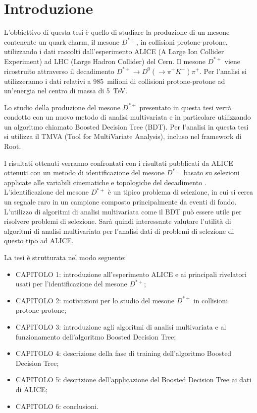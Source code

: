 \chapter*{Introduzione}
L'obbiettivo di questa tesi è quello di studiare la produzione di un mesone contenente un quark charm, il mesone $D^{*+}$,  in collisioni protone-protone, utilizzando i dati raccolti dall'esperimento ALICE (A Large Ion Collider Experiment) ad LHC (Large Hadron Collider) del Cern. Il mesone $D^{*+}$ viene ricostruito attraverso il decadimento $D^{*+} \rightarrow D^0(\rightarrow \pi^+ K^-) \pi^+$. Per l'analisi si utilizzeranno i dati relativi a 985~milioni di collisioni protone-protone ad un'energia nel centro di massa di 5~TeV.

Lo studio della produzione del mesone $D^{*+}$ presentato in questa tesi verrà condotto con un nuovo metodo di analisi multivariata e in particolare utilizzando un algoritmo chiamato Boosted Decision Tree (BDT). Per l'analisi in questa tesi si utilizza il TMVA \cite{TMVA} (Tool for MultiVariate Analysis), incluso nel framework di Root\cite{Root}. 

I risultati ottenuti verranno confrontati con i risultati pubblicati da ALICE ottenuti con un metodo di identificazione del mesone $D^{*+}$  basato su selezioni applicate alle variabili cinematiche e topologiche del decadimento \cite{dati_ALICE}. 
L'identificazione del mesone $D^{*+}$ è un tipico problema di selezione, in cui si cerca un segnale raro in un campione composto principalmente da eventi di fondo. L'utilizzo di algoritmi di analisi multivariata come il BDT può essere utile per risolvere problemi di selezione. Sar\`a quindi interessante valutare l'utilità di algoritmi di analisi multivariata per l'analisi dati di problemi di selezione di questo tipo ad ALICE.

La tesi \`e strutturata nel modo seguente:
    \begin{itemize}
        \item CAPITOLO 1: introduzione all'esperimento ALICE e ai principali rivelatori usati per l'identificazione del mesone $D^{*+}$;
        \item CAPITOLO 2: motivazioni per lo studio del mesone $D^{*+}$ in collisioni protone-protone;
        \item CAPITOLO 3: introduzione agli algoritmi di analisi multivariata e al funzionamento dell'algoritmo Boosted Decision Tree;
        \item CAPITOLO 4: descrizione della fase di training dell'algoritmo Boosted Decision Tree;
        \item CAPITOLO 5: descrizione dell'applicazione del Boosted Decision Tree ai dati di ALICE;
        \item CAPITOLO 6: conclusioni.
    \end{itemize}
